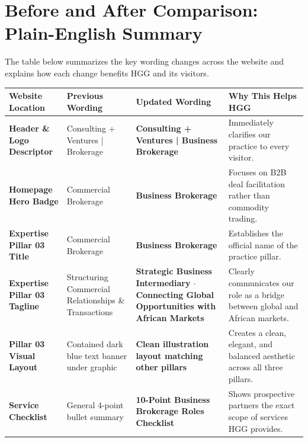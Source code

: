 \documentclass[11pt,a4paper]{article}
\begin{document}
\section{Before and After Comparison: Plain-English Summary}

The table below summarizes the key wording changes across the website and explains how each change benefits HGG and its visitors.

\begin{table}[H]
\centering
\small
\renewcommand{\arraystretch}{1.18}
\begin{tabularx}{\textwidth}{>{\raggedright\arraybackslash}p{3.0cm} >{\raggedright\arraybackslash}p{4.0cm} >{\raggedright\arraybackslash}p{4.4cm} >{\raggedright\arraybackslash}X}
\toprule
\textbf{Website Location} & \textbf{Previous Wording} & \textbf{Updated Wording} & \textbf{Why This Helps HGG} \\
\midrule
\textbf{Header \& Logo Descriptor} & Consulting + Ventures \newline | Brokerage & \textbf{Consulting + Ventures \newline | Business Brokerage} & Immediately clarifies our practice to every visitor. \\
\addlinespace
\textbf{Homepage Hero Badge} & Commercial Brokerage & \textbf{Business Brokerage} & Focuses on B2B deal facilitation rather than commodity trading. \\
\addlinespace
\textbf{Expertise Pillar 03 Title} & Commercial Brokerage & \textbf{Business Brokerage} & Establishes the official name of the practice pillar. \\
\addlinespace
\textbf{Expertise Pillar 03 Tagline} & Structuring Commercial Relationships \& Transactions & \textbf{Strategic Business Intermediary $\cdot$ Connecting Global Opportunities with African Markets} & Clearly communicates our role as a bridge between global and African markets. \\
\addlinespace
\textbf{Pillar 03 Visual Layout} & Contained dark blue text banner under graphic & \textbf{Clean illustration layout matching other pillars} & Creates a clean, elegant, and balanced aesthetic across all three pillars. \\
\addlinespace
\textbf{Service Checklist} & General 4-point bullet summary & \textbf{10-Point Business Brokerage Roles Checklist} & Shows prospective partners the exact scope of services HGG provides. \\

\end{tabularx}
\end{table}
\end{document}
